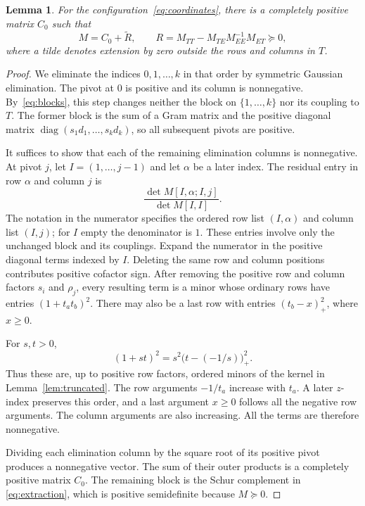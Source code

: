 \documentclass[11pt]{article}
\newtheorem{lemma}[theorem]{Lemma}
\theoremstyle{remark}
\DeclareMathOperator{\diag}{diag}
\begin{document}
\begin{lemma}\label{lem:elimination}
For the configuration~\eqref{eq:coordinates}, there is a completely positive
matrix $C_0$ such that
\begin{equation}\label{eq:extraction}
 M=C_0+\widetilde R,\qquad
 R=M_{TT}-M_{TE}M_{EE}^{-1}M_{ET}\succeq0,
\end{equation}
where a tilde denotes extension by zero outside the rows and columns in $T$.
\end{lemma}
\begin{proof}
We eliminate the indices $0,1,\ldots,k$ in that order by symmetric Gaussian
elimination. The pivot at $0$ is positive and its column is nonnegative.
By~\eqref{eq:blocks}, this step changes neither the block on $\{1,\ldots,k\}$
nor its coupling to $T$.
The former block is the sum of a Gram matrix and the positive diagonal matrix
$\diag(s_1d_1,\ldots,s_kd_k)$, so all subsequent pivots are positive.

It suffices to show that each of the remaining elimination columns is
nonnegative. At pivot $j$, let $I=(1,\ldots,j-1)$ and let $\alpha$ be a
later index. The residual entry in row $\alpha$ and column $j$ is
\[
 \frac{\det M[I,\alpha;I,j]}{\det M[I,I]}.
\]
The notation in the numerator specifies the ordered row list $(I,\alpha)$
and column list $(I,j)$; for $I$ empty the denominator is $1$.
These entries involve only the unchanged block and its couplings.
Expand the numerator in the positive diagonal terms indexed by $I$.
Deleting the same row and column positions contributes positive cofactor sign.
After removing the positive row and column factors $s_i$ and $\rho_j$,
every resulting term is a minor whose ordinary rows have entries
$(1+t_at_b)^2$. There may also be a last row with entries $(t_b-x)_+^2$,
where $x\ge0$.

For $s,t>0$,
\[
 (1+st)^2=s^2\bigl(t-(-1/s)\bigr)_+^2.
\]
Thus these are, up to positive row factors, ordered minors of the kernel in
Lemma~\ref{lem:truncated}. The row arguments $-1/t_a$ increase with $t_a$.
A later $z$-index preserves this order, and a last argument $x\ge0$ follows
all the negative row arguments. The column arguments are also increasing.
All the terms are therefore nonnegative.

Dividing each elimination column by the square root of its positive pivot
produces a nonnegative vector. The sum of their outer products is a completely
positive matrix $C_0$. The remaining block is the Schur complement in
\eqref{eq:extraction}, which is positive semidefinite because $M\succeq0$.
\end{proof}
\end{document}
